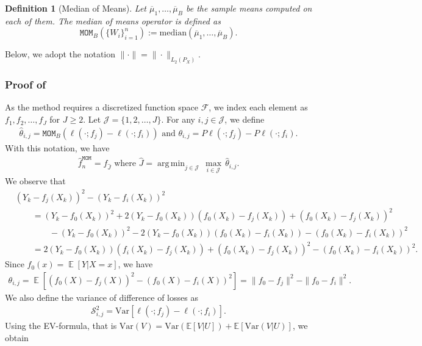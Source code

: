 \documentclass[12pt]{article}
\DeclareMathOperator*{\argmin}{arg\,min}
\DeclareMathOperator*{\E}{\mathbb{E}}
\newtheorem{definition}[theorem]{Definition}
\begin{document}
\begin{appendices}
\begin{definition}[Median of Means]
    Let $\overline{\mu}_1, \ldots, \overline{\mu}_B$ be the sample means computed on each of them. The median of means operator is defined as 
    \begin{equation*}
        \mathtt{MOM}_{B}(\{W_i\}_{i=1}^n) := \mathrm{median}(\overline{\mu}_1, \ldots, \overline{\mu}_B).
    \end{equation*}
\end{definition}
Below, we adopt the notation $\|\cdot\|= \|\cdot\|_{L_2(P_X)}$.
\subsubsection{Proof of }
As the method requires a discretized function space $\mathcal{F}$, we index each element as $f_1, f_2, \ldots, f_J$ for $J \ge 2$. Let $\mathcal{J} = \{1,2,\ldots, J\}$. For any $i, j \in \mathcal{J}$, we define 
\begin{align*}
    \widehat \theta_{i,j} = \mathtt{MOM}_{B}(\ell(\cdot; f_j) -  \ell(\cdot; f_i)) \text{ and } \theta_{i,j} = P \ell(\cdot; f_j) - P\ell(\cdot; f_i).
\end{align*}
With this notation, we have 
\begin{align}
    \widehat f^{\mathtt{MOM}}_n = f_{\widehat J} \text{ where } \widehat J = \argmin_{j \in \mathcal{J}}\, \max_{i \in \mathcal{J}} \, \widehat \theta_{i,j}.
\end{align}
We observe that 
\begin{align*}
&(Y_k - f_j(X_k))^2 - (Y_k - f_i(X_k))^2\\
&\qquad = (Y_k - f_0(X_k))^2 + 2(Y_k - f_0(X_k))(f_0(X_k) - f_j(X_k)) + (f_0(X_k) - f_j(X_k))^2\\
&\qquad\qquad - (Y_k - f_0(X_k))^2 - 2(Y_k - f_0(X_k))(f_0(X_k) - f_i(X_k)) - (f_0(X_k) - f_i(X_k))^2\\
&\qquad= 2(Y_k - f_0(X_k))(f_i(X_k) - f_j(X_k)) + (f_0(X_k) - f_j(X_k))^2 - (f_0(X_k) - f_i(X_k))^2.
\end{align*}
Since $f_0(x) = \E[Y|X=x]$, we have 
\begin{align*}
    \theta_{i,j} = \E[(f_0(X) - f_j(X))^2 - (f_0(X) - f_i(X))^2] = \|f_0-f_j\|^2 - \|f_0 - f_i\|^2.
\end{align*}
We also define the variance of difference of losses as
\begin{align*}
    \mathcal{S}^2_{i,j} = \mathrm{Var}[\ell(\cdot; f_j) - \ell(\cdot; f_i)].
\end{align*}
Using the EV-formula, that is $\mbox{Var}(V) = \mbox{Var}(\mathbb{E}[V|U]) + \mathbb{E}[\mbox{Var}(V|U)]$, we obtain

\end{appendices}
\end{document}
